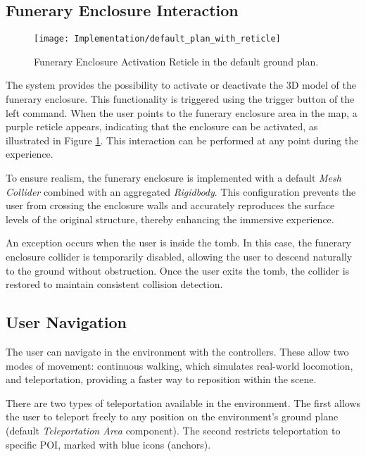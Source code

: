 \subsection{Funerary Enclosure Interaction}
\label{sec:funerary_interaction}

 \begin{figure}[h!]
    \centering
    \texttt{[image: Implementation/default\_plan\_with\_reticle]}
    \caption{Funerary Enclosure Activation Reticle in the default ground plan.}
    \label{fig:funerary_interaction}    
\end{figure}

The system provides the possibility to activate or deactivate the \gls{3D} model of the funerary enclosure.
This functionality is triggered using the trigger button of the left command. When the user points to the funerary enclosure area in the map, a purple reticle appears, indicating that the enclosure can be activated, as illustrated in Figure \ref{fig:funerary_interaction}. This interaction can be performed at any point during the experience.

To ensure realism, the funerary enclosure is implemented with a default \emph{Mesh Collider} combined with an aggregated \emph{Rigidbody}. This configuration prevents the user from crossing the enclosure walls and accurately reproduces the surface levels of the original structure, thereby enhancing the immersive experience.

An exception occurs when the user is inside the tomb. In this case, the funerary enclosure collider is temporarily disabled, allowing the user to descend naturally to the ground without obstruction. Once the user exits the tomb, the collider is restored to maintain consistent collision detection.

\subsection{User Navigation}
\label{sec:user_navigation}

The user can navigate in the environment with the controllers. 
These allow two modes of movement: continuous walking, which simulates real-world locomotion, and teleportation, providing a faster way to reposition within the scene.

There are two types of teleportation available in the environment. The first allows the user to teleport freely to any position on the environment’s ground plane (default \emph{Teleportation Area} component). The second restricts teleportation to specific \gls{POI}, marked with blue icons (anchors).

